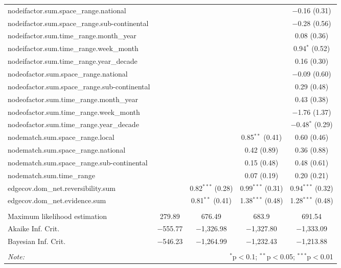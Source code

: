 \documentclass[9pt,]{article}
\begin{document}
\begin{tabular}{@{\extracolsep{5pt}}lcccc}
  nodeifactor.sum.space\_range.national &  &  &  & $-$0.16 (0.31) \\ 
  nodeifactor.sum.space\_range.sub-continental &  &  &  & $-$0.28 (0.56) \\ 
  nodeifactor.sum.time\_range.month\_year &  &  &  & 0.08 (0.36) \\ 
  nodeifactor.sum.time\_range.week\_month &  &  &  & 0.94$^{*}$ (0.52) \\ 
  nodeifactor.sum.time\_range.year\_decade &  &  &  & 0.16 (0.30) \\ 
  nodeofactor.sum.space\_range.national &  &  &  & $-$0.09 (0.60) \\ 
  nodeofactor.sum.space\_range.sub-continental &  &  &  & 0.29 (0.48) \\ 
  nodeofactor.sum.time\_range.month\_year &  &  &  & 0.43 (0.38) \\ 
  nodeofactor.sum.time\_range.week\_month &  &  &  & $-$1.76 (1.37) \\ 
  nodeofactor.sum.time\_range.year\_decade &  &  &  & $-$0.48$^{*}$ (0.29) \\ 
  nodematch.sum.space\_range.local &  &  & 0.85$^{**}$ (0.41) & 0.60 (0.46) \\ 
  nodematch.sum.space\_range.national &  &  & 0.42 (0.89) & 0.36 (0.88) \\ 
  nodematch.sum.space\_range.sub-continental &  &  & 0.15 (0.48) & 0.48 (0.61) \\ 
  nodematch.sum.time\_range &  &  & 0.07 (0.19) & 0.20 (0.21) \\ 
  edgecov.dom\_net.reversibility.sum &  & 0.82$^{***}$ (0.28) & 0.99$^{***}$ (0.31) & 0.94$^{***}$ (0.32) \\ 
  edgecov.dom\_net.evidence.sum &  & 0.81$^{**}$ (0.41) & 1.38$^{***}$ (0.48) & 1.28$^{***}$ (0.48) \\ 
 \hline \\[-1.8ex] 
Maximum likelihood estimation & 279.89 & 676.49 & 683.9 & 691.54 \\ 
Akaike Inf. Crit. & $-$555.77 & $-$1,326.98 & $-$1,327.80 & $-$1,333.09 \\ 
Bayesian Inf. Crit. & $-$546.23 & $-$1,264.99 & $-$1,232.43 & $-$1,213.88 \\ 
\hline 
\hline \\[-1.8ex] 
\textit{Note:}  & \multicolumn{4}{r}{$^{*}$p$<$0.1; $^{**}$p$<$0.05; $^{***}$p$<$0.01} \\ 
\end{tabular}

\endgroup
\end{document}
